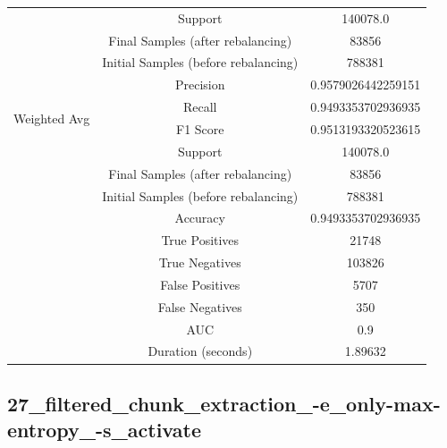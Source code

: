 \begin{longtable}{|c|c|c|}
 & Support & 140078.0 \\
 & Final Samples (after rebalancing) & 83856 \\
 & Initial Samples (before rebalancing) & 788381 \\
\hline
\multirow{4}{*}{Weighted Avg} & Precision & 0.9579026442259151 \\
 & Recall & 0.9493353702936935 \\
 & F1 Score & 0.9513193320523615 \\
 & Support & 140078.0 \\
 & Final Samples (after rebalancing) & 83856 \\
 & Initial Samples (before rebalancing) & 788381 \\
\hline
& Accuracy & 0.9493353702936935 \\ \hline
& True Positives & 21748 \\ \hline
& True Negatives & 103826 \\ \hline
& False Positives & 5707 \\ \hline
& False Negatives & 350 \\ \hline
& AUC & 0.9 \\ \hline
& Duration (seconds) & 1.89632 \\ \hline
\end{longtable}


\subsection{27\_filtered\_chunk\_extraction\_-e\_only-max-entropy\_-s\_activate}

